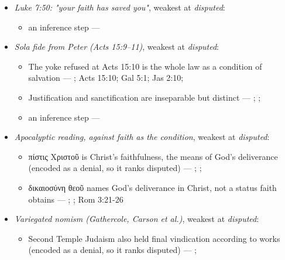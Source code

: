 \documentclass[11pt]{article}
\begin{document}
\begin{itemize}
\begin{itemize}
\item an inference step --- \cite[Trent, Session VI (1547), canon 9]{tanner-decrees-1990}
\item an inference step --- \cite{gathercole-where-boasting-2002}; \cite{carson-variegated-nomism-1-2001}
\end{itemize}
\item \emph{Luke 7:50: "your faith has saved you"}, weakest at \emph{disputed}:
\begin{itemize}
\item an inference step --- \cite[Trent, Session VI (1547), canon 9]{tanner-decrees-1990}
\end{itemize}
\item \emph{Sola fide from Peter (Acts 15:9–11)}, weakest at \emph{disputed}:
\begin{itemize}
\item The yoke refused at Acts 15:10 is the whole law as a condition of salvation --- \cite[ad loc. Acts 15:10]{bruce-acts-1988}; Acts 15:10; Gal 5:1; Jas 2:10; \cite{das-paul-law-covenant-2001}
\item Justification and sanctification are inseparable but distinct --- \cite[XIII.1]{westminster-confession-1647}; \cite[XI.1]{westminster-confession-1647}; \cite[III.xi.6]{calvin-institutes-1960}
\item an inference step --- \cite[Trent, Session VI (1547), canon 9]{tanner-decrees-1990}
\end{itemize}
\item \emph{Apocalyptic reading, against faith as the condition}, weakest at \emph{disputed}:
\begin{itemize}
\item πίστις Χριστοῦ is Christ's faithfulness, the means of God's deliverance (encoded as a denial, so it ranks disputed) --- \cite{campbell-deliverance-god-2009}; \cite[ad loc. Gal 2:16]{martyn-galatians-1997}; \cite{hays-faith-jesus-christ-2002}
\item δικαιοσύνη θεοῦ names God's deliverance in Christ, not a status faith obtains --- \cite{campbell-deliverance-god-2009}; \cite{martyn-galatians-1997}; Rom 3:21-26
\end{itemize}
\item \emph{Variegated nomism (Gathercole, Carson et al.)}, weakest at \emph{disputed}:
\begin{itemize}
\item Second Temple Judaism also held final vindication according to works (encoded as a denial, so it ranks disputed) --- \cite{gathercole-where-boasting-2002}; \cite{carson-variegated-nomism-1-2001}

\end{itemize}
\end{itemize}
\end{document}

